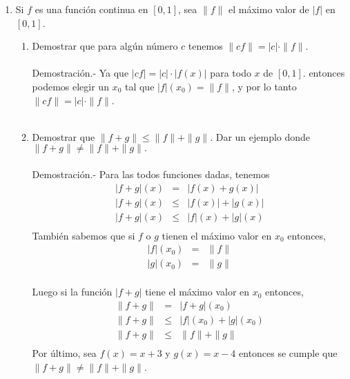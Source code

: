 \begin{enumerate}[\bfseries 1.]
\begin{enumerate}[\bfseries (a)]
    \end{enumerate}

\item Si $f$ es una función continua en $[0,1]$, sea $\|f\|$ el máximo valor de $|f|$ en $[0,1]$.

    \begin{enumerate}[\bfseries (a)]

	\item Demostrar que para algún número $c$ tenemos $\|cf\| = |c|\cdot \|f\|$.\\\\
	    Demostración.-\; Ya que $|cf|=|c|\cdot |f(x)|$ para todo $x$ de $[0,1].$ entonces podemos elegir un $x_0$ tal que $|f|(x_0)=\|f\|$, y por lo tanto $\|cf\| = |c|\cdot \|f\|$.\\\\

	\item Demostrar que $\|f+g\|\leq \|f\|+\|g\|.$ Dar un ejemplo donde $\|f+g\|\neq \|f\|+\|g\|.$\\\\
	    Demostración.-\; Para las todos funciones dadas, tenemos
	    $$\begin{array}{rcl}
		|f+g|(x)&=&|f(x)+g(x)|\\
		|f+g|(x)&\leq&|f(x)|+|g(x)|\\
		|f+g|(x)&\leq&|f|(x)+|g|(x)\\
	    \end{array}$$
	    También sabemos que si $f$ o $g$ tienen el máximo valor en $x_0$ entonces,
	    $$\begin{array}{rcl}
		|f|(x_0)&=&\|f\|\\
		|g|(x_0)&=&\|g\|\\
	    \end{array}$$

	    Luego si la función $|f+g|$ tiene el máximo valor en $x_0$ entonces,
	    $$\begin{array}{rcl}
		\|f+g\|&=&|f+g|(x_0)\\
		\|f+g\|&\leq&|f|(x_0) + |g|(x_0)\\
		       \|f+g\|&\leq&\|f\| + \|g\|\\
	    \end{array}$$
	    Por último, sea $f(x)=x+3$ y $g(x)=x-4$ entonces se cumple que $\|f+g\|\neq \|f\|+\|g\|$.\\\\


\end{enumerate}
\end{enumerate}
